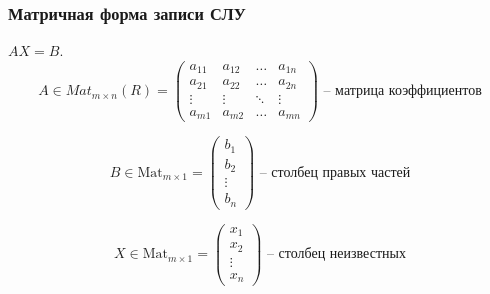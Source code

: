 \subsubsection*{Матричная форма записи СЛУ}

$AX = B$.
\begin{equation*}
    A \in Mat_{m \times n}(R) = \begin{pmatrix}
        a_{11} & a_{12} & \dots & a_{1n} \\
        a_{21} & a_{22} & \dots & a_{2n} \\
        \vdots & \vdots & \ddots & \vdots \\
        a_{m1} & a_{m2} & \dots & a_{mn}
    \end{pmatrix} \text{ -- матрица коэффициентов}
\end{equation*}

\begin{equation*}
    B \in \text{Mat}_{m \times 1} = \begin{pmatrix}
        b_1 \\ b_2 \\ \vdots \\ b_n
    \end{pmatrix} \text{ -- столбец правых частей}
\end{equation*}

\begin{equation*}
    X \in \text{Mat}_{m \times 1} = \begin{pmatrix}
        x_1 \\ x_2 \\ \vdots \\ x_n
    \end{pmatrix} \text{ -- столбец неизвестных}
\end{equation*} 
